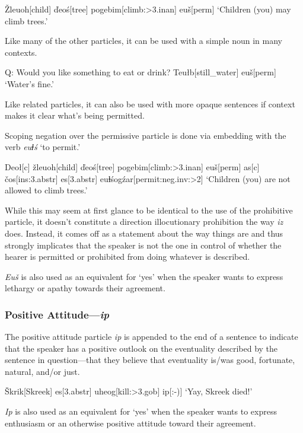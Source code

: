 \documentclass[a4paper,11pt,oneside,openany]{memoir}
\newcommand{\vd}{ď}
\newcommand{\vc}{č}
\newcommand{\vz}{ž}
\newcommand{\vs}{š}
\newcommand{\vZ}{Ž}
\newcommand{\vS}{Š}
\newcommand{\dbl}{ⱡ}
\begin{document}
\ex
\begingl
\vZ leuoh[child]
\vd eo\'s[tree]
pogebim[climb:{\sc >3.inan}]
eu\vs[\sc perm]
\glft `Children (you) may climb trees.'
\endgl
\xe

Like many of the other particles, it can be used with a simple noun in many contexts.

\ex 
\begingl
\glpreamble
Q: Would you like something to eat or drink?
\endpreamble
{}
Teu\l b[still\_water]
eu\vs[\sc perm]
\glft\phantom{A: }`Water's fine.'
\endgl
\xe

Like related particles, it can also be used with more opaque sentences if context makes it clear what's being permitted. 

Scoping negation over the permissive particle is done via embedding with the verb \textit{eu\dbl\'s} `to permit.'

\ex 
\begingl
Deo\l[\sc c]
\vz leuoh[child]
\vd eo\'s[tree]
pogebim[climb:{\sc >3.inan}]
eu\vs[\sc perm]
\nogloss{,}
as[\sc c]
\vc os[\sc ins:3.abstr]
es[\sc 3.abstr]
eu\dbl\'sog\'zar[permit:{\sc neg.inv:>2}]
\glft `Children (you) are not allowed to climb trees.'
\endgl
\xe

While this may seem at first glance to be identical to the use of the prohibitive particle, it doesn't constitute a direction illocutionary prohibition the way \textit{iz} does. Instead, it comes off as a statement about the way things are and thus strongly implicates that the speaker is not the one in control of whether the hearer is permitted or prohibited from doing whatever is described.

\textit{Eu\vs} is also used as an equivalent for `yes' when the speaker wants to express lethargy or apathy towards their agreement.

\subsubsection{Positive Attitude---\textit{ip}}

The positive attitude particle \textit{ip} is appended to the end of a sentence to indicate that the speaker has a positive outlook on the eventuality described by the sentence in question---that they believe that eventuality is/was good, fortunate, natural, and/or just.

\ex
\begingl
\vS krik[Skreek]
es[\sc 3.abstr]
uheog[kill:{\sc >3.gob}]
ip[:-{)}]
\glft `Yay, Skreek died!'
\endgl
\xe

\textit{Ip} is also used as an equivalent for `yes' when the speaker wants to express enthusiasm or an otherwise positive attitude toward their agreement.
\end{document}
